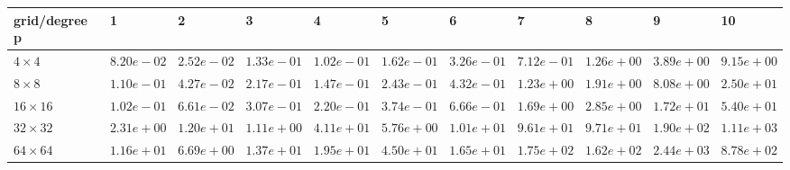 \begin{tabular}{lllllllllll}
\hline
 grid/degree p   & 1          & 2          & 3          & 4          & 5          & 6          & 7          & 8          & 9          & 10         \\
\hline
 $4 \times 4$    & $8.20e-02$ & $2.52e-02$ & $1.33e-01$ & $1.02e-01$ & $1.62e-01$ & $3.26e-01$ & $7.12e-01$ & $1.26e+00$ & $3.89e+00$ & $9.15e+00$ \\
 $8 \times 8$    & $1.10e-01$ & $4.27e-02$ & $2.17e-01$ & $1.47e-01$ & $2.43e-01$ & $4.32e-01$ & $1.23e+00$ & $1.91e+00$ & $8.08e+00$ & $2.50e+01$ \\
 $16 \times 16$  & $1.02e-01$ & $6.61e-02$ & $3.07e-01$ & $2.20e-01$ & $3.74e-01$ & $6.66e-01$ & $1.69e+00$ & $2.85e+00$ & $1.72e+01$ & $5.40e+01$ \\
 $32 \times 32$  & $2.31e+00$ & $1.20e+01$ & $1.11e+00$ & $4.11e+01$ & $5.76e+00$ & $1.01e+01$ & $9.61e+01$ & $9.71e+01$ & $1.90e+02$ & $1.11e+03$ \\
 $64 \times 64$  & $1.16e+01$ & $6.69e+00$ & $1.37e+01$ & $1.95e+01$ & $4.50e+01$ & $1.65e+01$ & $1.75e+02$ & $1.62e+02$ & $2.44e+03$ & $8.78e+02$ \\
\hline
\end{tabular}